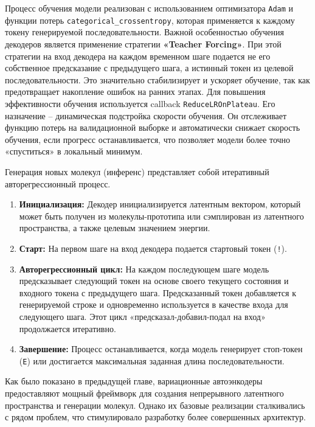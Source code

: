 
Процесс обучения модели реализован с использованием оптимизатора \texttt{Adam} и функции потерь \texttt{categorical\_crossentropy}, которая применяется к каждому токену генерируемой последовательности. Важной особенностью обучения декодеров является применение стратегии \textbf{«Teacher Forcing»}. При этой стратегии на вход декодера на каждом временном шаге подается не его собственное предсказание с предыдущего шага, а истинный токен из целевой последовательности. Это значительно стабилизирует и ускоряет обучение, так как предотвращает накопление ошибок на ранних этапах. Для повышения эффективности обучения используется callback \texttt{ReduceLROnPlateau}. Его назначение -- динамическая подстройка скорости обучения. Он отслеживает функцию потерь на валидационной выборке и автоматически снижает скорость обучения, если прогресс останавливается, что позволяет модели более точно «спуститься» в локальный минимум.

Генерация новых молекул (инференс) представляет собой итеративный авторегрессионный процесс.
\begin{enumerate}
	\item \textbf{Инициализация:} Декодер инициализируется латентным вектором, который может быть получен из молекулы-прототипа или сэмплирован из латентного пространства, а также целевым значением энергии.
	\item \textbf{Старт:} На первом шаге на вход декодера подается стартовый токен (\texttt{!}).
	\item \textbf{Авторегрессионный цикл:} На каждом последующем шаге модель предсказывает следующий токен на основе своего текущего состояния и входного токена с предыдущего шага. Предсказанный токен добавляется к генерируемой строке и одновременно используется в качестве входа для следующего шага. Этот цикл «предсказал-добавил-подал на вход» продолжается итеративно.
	\item \textbf{Завершение:} Процесс останавливается, когда модель генерирует стоп-токен (\texttt{E}) или достигается максимальная заданная длина последовательности.
\end{enumerate}


Как было показано в предыдущей главе, вариационные автоэнкодеры предоставляют мощный фреймворк для создания непрерывного латентного пространства и генерации молекул. Однако их базовые реализации сталкивались с рядом проблем, что стимулировало разработку более совершенных архитектур.

